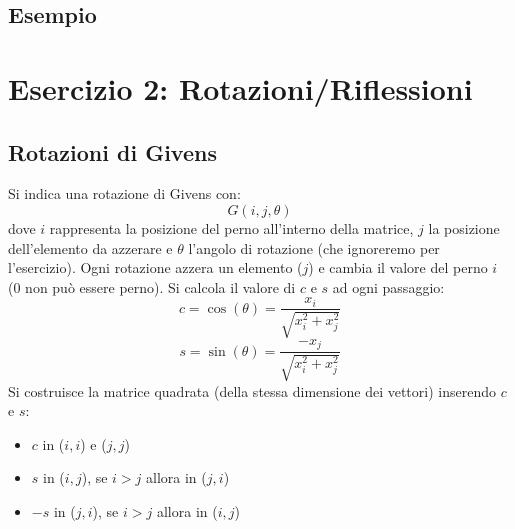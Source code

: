 \documentclass[10pt]{article}
\begin{document}
\subsection*{Esempio}

\newpage
\section{Esercizio 2: Rotazioni/Riflessioni}
\subsection{Rotazioni di Givens}
Si indica una rotazione di Givens con:
\begin{equation*}
    G(i,j,\theta)
\end{equation*}
dove $i$ rappresenta la posizione del perno all'interno della matrice, $j$ la posizione dell'elemento da azzerare e $\theta$ l'angolo di rotazione (che ignoreremo per l'esercizio). Ogni rotazione azzera un elemento ($j$) e cambia il valore del perno $i$ (0 non può essere perno). Si calcola il valore di $c$ e $s$ ad ogni passaggio:
\begin{equation*}
    c = \cos(\theta)=\frac{x_{i}}{\sqrt{x_{i}^{2}+x_{j}^{2}}}
\end{equation*}
\begin{equation*}
    s = \sin(\theta)=\frac{-x_{j}}{\sqrt{x_{i}^{2}+x_{j}^{2}}}
\end{equation*}
Si costruisce la matrice quadrata (della stessa dimensione dei vettori) inserendo $c$ e $s$:
\begin{itemize}
    \item $c$ in ($i,i$) e ($j,j$)
    \item $s$ in ($i,j$), se $i>j$ allora in ($j,i$)
    \item $-s$ in ($j,i$), se $i>j$ allora in ($i,j$)
\end{itemize}
\end{document}
